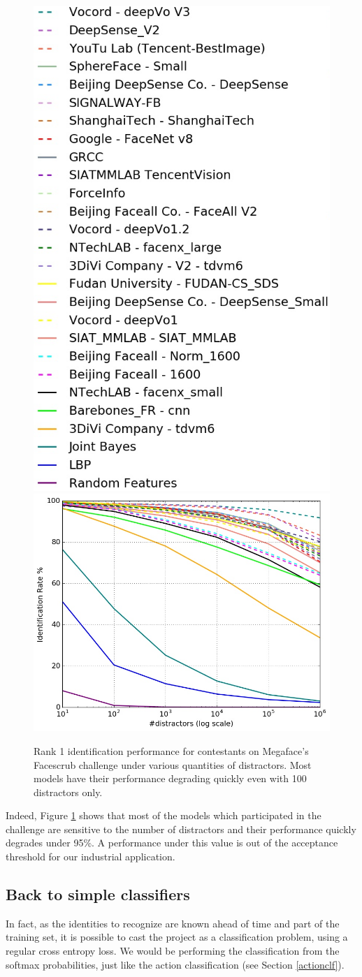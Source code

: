 \begin{figure}
    \centering
    \includegraphics[width=0.3\columnwidth]{50-files/CH1_Legend.png}
    \includegraphics[width=0.45\columnwidth]{50-files/facescrub_rank-1_cmbnd_set_1.jpg}
    \caption{Rank 1 identification performance for contestants on Megaface's Facescrub challenge under various quantities of distractors. Most models have their performance degrading quickly even with 100 distractors only.}
    \label{fig:megafacebad}
\end{figure}

Indeed, Figure \ref{fig:megafacebad} shows that most of the models which participated in the challenge are sensitive to the number of distractors and their performance quickly degrades under 95\%. A performance under this value is out of the acceptance threshold for our industrial application.

\subsection{Back to simple classifiers}

In fact, as the identities to recognize are known ahead of time and part of the training set, it is possible to cast the project as a classification problem, using a regular cross entropy loss. We would be performing the classification from the softmax probabilities, just like the action classification (see Section \ref{actionclf}).

